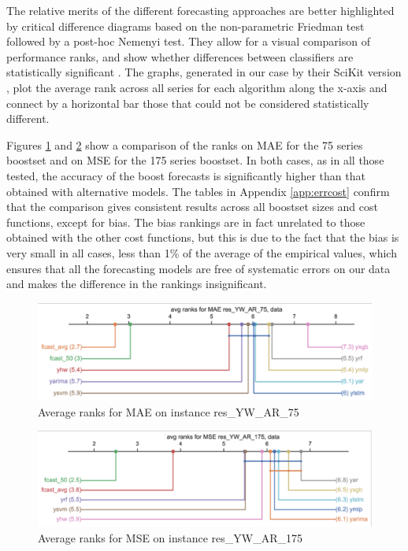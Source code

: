 \documentclass[ijoc,sglanonrev]{informs4}
\begin{document}
The relative merits of the different forecasting approaches are better highlighted by critical difference diagrams based on the non-parametric Friedman test followed by a post-hoc Nemenyi test. They allow for a visual comparison of performance ranks, and show whether differences between classifiers are statistically significant \citep{D06}. The graphs, generated in our case by their SciKit version \citep{SciKitCD}, plot the average rank across all series for each algorithm along the x-axis and connect by a horizontal bar those that could not be considered statistically different.

Figures \ref{fig:ywar75} and \ref{fig:ywar175} show a comparison of the ranks on MAE for the 75 series boostset and on MSE for the 175 series boostset. In both cases, as in all those tested, the accuracy of the boost forecasts is significantly higher than that obtained with alternative models. The tables in Appendix \ref{app:errcost} confirm that the comparison gives consistent results across all boostset sizes and cost functions, except for bias. The bias rankings are in fact unrelated to those obtained with the other cost functions, but this is due to the fact that the bias is very small in all cases, less than 1\% of the average of the empirical values, which ensures that all the forecasting models are free of systematic errors on our data and makes the difference in the rankings insignificant.

\begin{figure}[ht] 
    \centering
    \includegraphics[width=0.75\linewidth]{sp_MAE_res_YW_AR_75.eps}%
    \caption{Average ranks for MAE on instance res\_YW\_AR\_75}
    \label{fig:ywar75}
\end{figure}

\begin{figure}[ht] 
    \centering
    \includegraphics[width=0.75\linewidth]{sp_MSE_res_YW_AR_175.eps}%
    \caption{Average ranks for MSE on instance res\_YW\_AR\_175}
    \label{fig:ywar175}
\end{figure}
\end{document}
